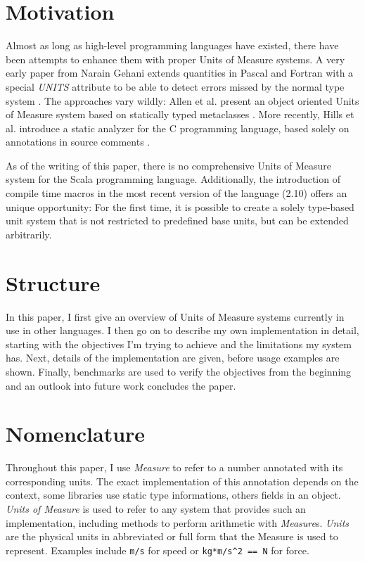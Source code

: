 \documentclass[12pt,oneside,a4paper]{scrbook}
\begin{document}
\section{Motivation}

Almost as long as high-level programming languages have existed, there have been attempts to enhance them with proper Units of Measure systems. A very early paper from Narain Gehani extends quantities in Pascal and Fortran with a special \emph{UNITS} attribute to be able to detect errors missed by the normal type system \citep{Gehani1977}. The approaches vary wildly: Allen et al. present an object oriented Units of Measure system based on statically typed metaclasses \citep{Allen04}.  More recently, Hills et al. introduce a static analyzer for the C programming language, based solely on annotations in source comments \citep{Hills2012}.

As of the writing of this paper, there is no comprehensive Units of Measure system for the Scala programming language. Additionally, the introduction of compile time macros in the most recent version of the language (2.10) offers an unique opportunity: For the first time, it is possible to create a solely type-based unit system that is not restricted to predefined base units, but can be extended arbitrarily.

\section{Structure}

In this paper, I first give an overview of Units of Measure systems currently in use in other languages. I then go on to describe my own implementation in detail, starting with the objectives I'm trying to achieve and the limitations my system has. Next, details of the implementation are given, before usage examples are shown. Finally, benchmarks are used to verify the objectives from the beginning and an outlook into future work concludes the paper.


\section{Nomenclature}
Throughout this paper, I use \emph{Measure} to refer to a number annotated with its corresponding units. The exact implementation of this annotation depends on the context, some libraries use static type informations, others fields in an object. \emph{Units of Measure} is used to refer to any system that provides such an implementation, including methods to perform arithmetic with \emph{Measure}s. \emph{Units} are the physical units in abbreviated or full form that the Measure is used to represent. Examples include \verb|m/s| for speed or \verb|kg*m/s^2 == N| for force.
\end{document}
